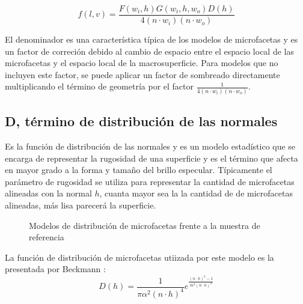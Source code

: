             \begin{equation}
                f(l, v) = \frac{F(w_i, h) G(w_i, h, w_o) D(h)} {4(n\cdot{w_i}) (n \cdot{w_o})}
            \end{equation}
            \singlespacing
            
            
            El denominador es una caracter\'istica t\'ipica de los modelos de microfacetas y es un factor de correci\'on
            debido al cambio de espacio entre el espacio local de las microfacetas y el espacio local de la macrosuperficie. Para modelos
            que no incluyen este factor, se puede aplicar un factor de sombreado directamente multiplicando el t\'ermino de geometr\'ia
            por el factor $\frac{1}{4(n\cdot{w_i}) (n\cdot{w_o})}$.\\

            \singlespacing
            \subsection*{D, t\'ermino de distribuci\'on de las normales}
            Es la funci\'on de distribuci\'on de las normales y es un modelo estad\'istico que se encarga de representar
            la rugosidad de una superficie y es el t\'ermino que afecta en mayor grado a la forma y tama\~no del brillo especular. T\'ipicamente el par\'ametro de
            rugosidad se utiliza para representar la cantidad de microfacetas alineadas con la normal $h$, cuanta mayor sea la
            la cantidad de de microfacetas alineadas, m\'as lisa parecer\'a la superficie.\\

            \begin{figure}[H]
                \vspace{0.5cm}
                \centering
                \caption{Modelos de distribuci\'on de microfacetas frente a la muestra de referencia}
                \vspace{0.5cm}
            \end{figure}

            La funci\'on de distribuci\'on de microfacetas utiizada por este modelo es la presentada por Beckmann \autocite{beckmann}:\\

            \begin{equation}
                D(h) =
                \frac{1}{\pi\alpha^2(n\cdot{h})^4}
                e^{
                    \frac
                    {(n\cdot{h})^2 - 1}
                    {m^2(n\cdot{h})^2}
                }
            \end{equation}
            \singlespacing

